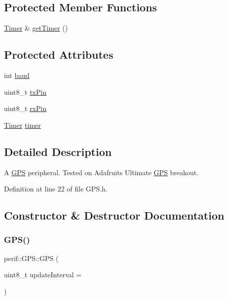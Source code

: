 \subsection*{Protected Member Functions}
\begin{DoxyCompactItemize}
\item 
\mbox{\hyperlink{classTimer}{Timer}} \& \mbox{\hyperlink{classperif_1_1Perif_a29c48598a861d85256c30e28af67f864}{get\+Timer}} ()
\end{DoxyCompactItemize}
\subsection*{Protected Attributes}
\begin{DoxyCompactItemize}
\item 
int \mbox{\hyperlink{classperif_1_1UARTPerif_a8d5c1c0ce1f1758392dc0145f0caade8}{baud}}
\item 
uint8\+\_\+t \mbox{\hyperlink{classperif_1_1UARTPerif_a338fb2e5db8bd91213b13524ac9d89aa}{tx\+Pin}}
\item 
uint8\+\_\+t \mbox{\hyperlink{classperif_1_1UARTPerif_a68a86b1e2ca06e42ef72fb4ca0792110}{rx\+Pin}}
\item 
\mbox{\hyperlink{classTimer}{Timer}} \mbox{\hyperlink{classperif_1_1Perif_acfa1256201bead82ccce1a0a8bcc24e1}{timer}}
\end{DoxyCompactItemize}


\subsection{Detailed Description}
A \mbox{\hyperlink{classperif_1_1GPS}{G\+PS}} peripheral. Tested on Adafruit\textquotesingle{}s Ultimate \mbox{\hyperlink{classperif_1_1GPS}{G\+PS}} breakout. 

Definition at line 22 of file G\+P\+S.\+h.



\subsection{Constructor \& Destructor Documentation}
\mbox{\label{classperif_1_1GPS_aa853a974f31d5d7cfa22c86ebd57a03a}} 
\subsubsection{\texorpdfstring{GPS()}{GPS()}}
{\footnotesize\ttfamily perif\+::\+G\+P\+S\+::\+G\+PS (\begin{DoxyParamCaption}\item[{uint8\+\_\+t}]{update\+Interval = {} }\end{DoxyParamCaption})\hspace{0.3cm}{\ttfamily [explicit]}}

